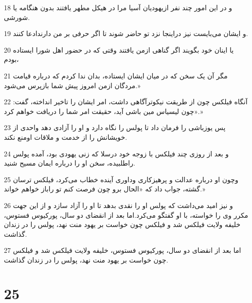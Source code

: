 \par 18 و در این امور چند نفر ازیهودیان آسیا مرا در هیکل مطهر یافتند بدون هنگامه یا شورشی.
\par 19 و ایشان می‌بایست نیز دراینجا نزد تو حاضر شوند تا اگر حرفی بر من دارندادعا کنند.
\par 20 یا اینان خود بگویند اگر گناهی ازمن یافتند وقتی که در حضور اهل شورا ایستاده بودم،
\par 21 مگر آن یک سخن که در میان ایشان ایستاده، بدان ندا کردم که درباره قیامت مردگان ازمن امروز پیش شما بازپرس می‌شود.»
\par 22 آنگاه فیلکس چون از طریقت نیکوترآگاهی داشت، امر ایشان را تاخیر انداخته، گفت: «چون لیسیاس مین باشی آید، حقیقت امر شما را دریافت خواهم کرد.»
\par 23 پس یوزباشی را فرمان داد تا پولس را نگاه دارد و او را آزادی دهد واحدی از خویشانش را از خدمت و ملاقات اومنع نکند.
\par 24 و بعد از روزی چند فیلکس با زوجه خود درسلا که زنی یهودی بود، آمده پولس راطلبیده، سخن او را درباره ایمان مسیح شنید.
\par 25 وچون او درباره عدالت و پرهیزکاری وداوری آینده خطاب می‌کرد، فیلکس ترسان گشته، جواب داد که «الحال برو چون فرصت کنم تو راباز خواهم خواند.»
\par 26 و نیز امید می‌داشت که پولس او را نقدی بدهد تا او را آزاد سازد و از این جهت مکرر وی را خواسته، با او گفتگو می‌کرد.اما بعد از انقضای دو سال، پورکیوس فستوس، خلیفه ولایت فیلکس شد و فیلکس چون خواست بر یهود منت نهد، پولس را در زندان گذاشت.
\par 27 اما بعد از انقضای دو سال، پورکیوس فستوس، خلیفه ولایت فیلکس شد و فیلکس چون خواست بر یهود منت نهد، پولس را در زندان گذاشت.

\chapter{25}

